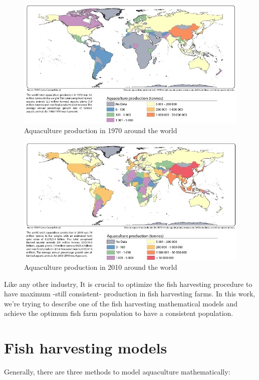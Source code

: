\begin{figure}[H]
	\includegraphics[width=\textwidth]{1970.jpeg}
	\caption{Aquaculture production in 1970 around the world}
\end{figure}
\label{fig1.3} 

\begin{figure}[H]
	\includegraphics[width=\textwidth]{2010.jpeg}
	\caption{Aquaculture production in 2010 around the world}
\end{figure}
\label{fig1.4} 

Like any other industry, It is crucial to optimize the fish harvesting procedure to have maximum -still consistent- production in fish harvesting farms. In this work, we’re trying to describe one of the fish harvesting mathematical models and achieve the optimum fish farm population to have a consistent population.

\section{Fish harvesting models}

Generally, there are three methods to model aquaculture mathematically:

